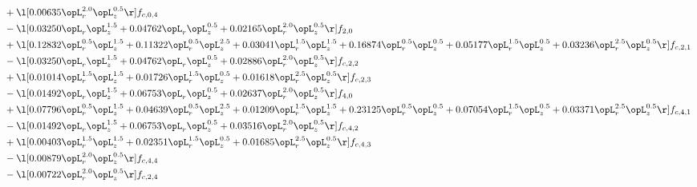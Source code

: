 \begin{alignat}{2}
& + \l[  0.00635 \opL_r^{2.0} \opL_z^{0.5}  \r] f_{c,0,4} \nonumber \\ 
& - \l[  0.03250 \opL_r \opL_z^{1.5} +  0.04762 \opL_r \opL_z^{0.5} +  0.02165 \opL_r^{2.0} \opL_z^{0.5}  \r] f_{2,0} \nonumber \\ 
& + \l[  0.12832 \opL_r^{0.5} \opL_z^{1.5} +  0.11322 \opL_r^{0.5} \opL_z^{2.5} +  0.03041 \opL_r^{1.5} \opL_z^{1.5} +  0.16874 \opL_r^{0.5} \opL_z^{0.5} +  0.05177 \opL_r^{1.5} \opL_z^{0.5} +  0.03236 \opL_r^{2.5} \opL_z^{0.5}  \r] f_{c,2,1} \nonumber \\ 
& - \l[  0.03250 \opL_r \opL_z^{1.5} +  0.04762 \opL_r \opL_z^{0.5} +  0.02886 \opL_r^{2.0} \opL_z^{0.5}  \r] f_{c,2,2} \nonumber \\ 
& + \l[  0.01014 \opL_r^{1.5} \opL_z^{1.5} +  0.01726 \opL_r^{1.5} \opL_z^{0.5} +  0.01618 \opL_r^{2.5} \opL_z^{0.5}  \r] f_{c,2,3} \nonumber \\ 
& - \l[  0.01492 \opL_r \opL_z^{1.5} +  0.06753 \opL_r \opL_z^{0.5} +  0.02637 \opL_r^{2.0} \opL_z^{0.5}  \r] f_{4,0} \nonumber \\ 
& + \l[  0.07796 \opL_r^{0.5} \opL_z^{1.5} +  0.04639 \opL_r^{0.5} \opL_z^{2.5} +  0.01209 \opL_r^{1.5} \opL_z^{1.5} +  0.23125 \opL_r^{0.5} \opL_z^{0.5} +  0.07054 \opL_r^{1.5} \opL_z^{0.5} +  0.03371 \opL_r^{2.5} \opL_z^{0.5}  \r] f_{c,4,1} \nonumber \\ 
& - \l[  0.01492 \opL_r \opL_z^{1.5} +  0.06753 \opL_r \opL_z^{0.5} +  0.03516 \opL_r^{2.0} \opL_z^{0.5}  \r] f_{c,4,2} \nonumber \\ 
& + \l[  0.00403 \opL_r^{1.5} \opL_z^{1.5} +  0.02351 \opL_r^{1.5} \opL_z^{0.5} +  0.01685 \opL_r^{2.5} \opL_z^{0.5}  \r] f_{c,4,3} \nonumber \\ 
& - \l[  0.00879 \opL_r^{2.0} \opL_z^{0.5}  \r] f_{c,4,4} \nonumber \\ 
& - \l[  0.00722 \opL_r^{2.0} \opL_z^{0.5}  \r] f_{c,2,4} \nonumber \\ 
\end{alignat} 


